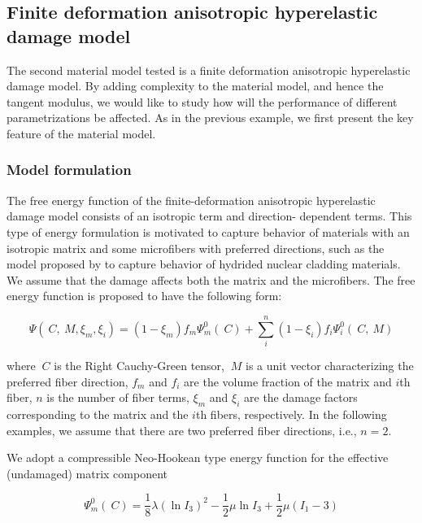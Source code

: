 \documentclass[12pt]{article}
\numberwithin{equation}{section}
\begin{document}
\subsection{Finite deformation anisotropic hyperelastic damage model}
\label{subsec:anisotropic}

The second material model tested is a finite deformation anisotropic
hyperelastic damage model. By adding complexity to the material model,
and hence the tangent modulus, we would like to study how will the
performance of different parametrizations be affected. As in the
previous example, we first present the key feature of the material
model.

\subsubsection{Model formulation}

The free energy function of the finite-deformation anisotropic
hyperelastic damage model consists of an isotropic term and direction-
dependent terms. This type of energy formulation is motivated to
capture behavior of materials with an isotropic matrix and some
microfibers with preferred directions, such as the model proposed by
\citet{Chen.etal:2014} to capture behavior of hydrided nuclear
cladding materials. We assume that the damage affects both the matrix
and the microfibers. The free energy function is proposed to have the
following form:

\begin{equation}\label{eq:aniso_energy}
  \Psi (~C, ~M, \xi_m, \xi_i)
    = (1-\xi_m) f_m \Psi_m^0(~C)
    + \sum_{i}^{n} (1-\xi_i) f_i \Psi_i^0(~C, ~M)
\end{equation}

where $~C$ is the Right Cauchy-Green tensor, $~M$ is a
unit vector characterizing the preferred fiber direction, $f_m$ and
$f_i$ are the volume fraction of the matrix and $i$th fiber, $n$ is
the number of fiber terms, $\xi_m$ and $\xi_i$ are the damage factors
corresponding to the matrix and the $i$th fibers, respectively. In the
following examples, we assume that there are two preferred fiber
directions, i.e., $n=2$.

We adopt a compressible Neo-Hookean type energy function for the
effective (undamaged) matrix component

\begin{equation}\label{eq:aniso_Psim0}
  \Psi_m^0 (~C)
    = \frac{1}{8}\lambda (\ln I_3)^2
    - \frac{1}{2}\mu \ln I_3
    + \frac{1}{2}\mu( I_1 - 3)
\end{equation}
\end{document}
